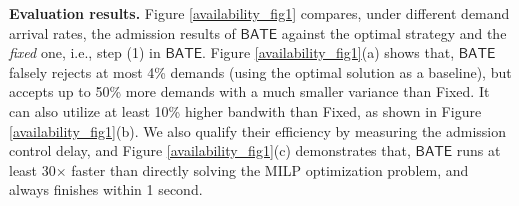 \documentclass[sigconf]{acmart}
\begin{document}
%



\textbf{Evaluation results.}
Figure \ref{availability_fig1} compares, under different demand arrival rates, 
the admission results of $\mathsf{BATE}$  against  
the optimal strategy and the \textit{fixed} one, i.e., step (1) in $\mathsf{BATE}$. 
Figure \ref{availability_fig1}(a) shows that, $\mathsf{BATE}$ falsely rejects at most 4\% demands (using the optimal solution as a baseline), but accepts up to 50\% more demands with a much smaller variance than Fixed. 
It can also utilize at least 10\% higher bandwith than Fixed, as shown in Figure \ref{availability_fig1}(b). 
We also qualify their efficiency by measuring the admission control delay, and Figure \ref{availability_fig1}(c) demonstrates that, $\mathsf{BATE}$ runs at least 30$\times$ faster than directly solving the MILP optimization problem, and always finishes within 1 second. 
%
\end{document}
